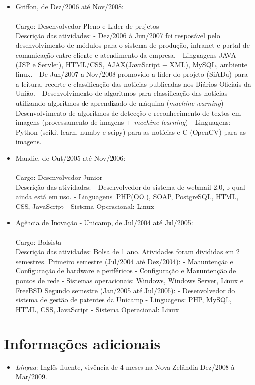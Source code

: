 \documentclass[a4paper,11pt]{article}
\begin{document}
\begin{itemize}
\item {Griffon, de Dez/2006 até Nov/2008}: \\
{\small \\ 
  {Cargo}: Desenvolvedor Pleno e Líder de projetos\\
  {Descrição das atividades}: 
  \subitem - Dez/2006 à Jun/2007 foi resposável pelo desenvolvimento de módulos para o sistema de produção, intranet e portal de comunicação entre cliente e atendimento da empresa. 
  \subsubitem - Linguagens {JAVA (JSP e Servlet), HTML/CSS, AJAX(JavaScript + XML), MySQL}, ambiente linux.
  \subitem - De Jun/2007 a Nov/2008 promovido a líder do projeto (SiADu) para a leitura, recorte e classificação das noticias publicadas nos Diários Oficiais da União.
	\subsubitem - Desenvolvimento de algoritmos para classificação das notícias utilizando algoritmos de aprendizado de máquina (\textit{machine-learning})
	\subsubitem - Desenvolvimento de algoritmos de detecção e reconhecimento de textos em imagens (processamento de imagens + \textit{machine-learning})
	\subsubitem - Linguagens: Python (scikit-learn, numby e scipy) para as notícias e C (OpenCV) para as imagens.\\
}
\item {Mandic, de Out/2005 até Nov/2006}:\\
{\small \\ 
	  {Cargo}: Desenvolvedor Junior\\
	  {Descrição das atividades}: 
	  \subitem - Desenvolvedor do sistema de webmail 2.0, o qual ainda está em uso. 
	  \subitem - Linguagens: PHP(OO.), SOAP, PostgreSQL, HTML, CSS, JavaScript 
	  \subitem - Sistema Operacional: Linux
}

\item {Agência de Inovação - Unicamp, de Jul/2004 até Jul/2005}:\\
{\small \\ 
  {Cargo}: Bolsista\\
  {Descrição das atividades}: Bolsa de 1 ano. Atividades foram divididas em 2 semestres.
  \subitem Primeiro semestre (Jul/2004 até Dez/2004):
	  \subsubitem - Manuntenção e Configuração de hardware e periféricos
	  \subsubitem - Configuração e Manuntenção de pontos de rede
	  \subsubitem - Sistemas operacionais: Windows, Windows Server, Linux e FreeBSD
 \subitem Segundo semestre (Jan/2005 até Jul/2005):
	  \subsubitem - Desenvolvedor do sistema de gestão de patentes da Unicamp
	  \subsubitem - Linguagens: PHP, MySQL, HTML, CSS, JavaScript
	  \subsubitem - Sistema Operacional: Linux\\
}
 
\end{itemize}
\section{Informações adicionais}
\begin{itemize}
\item \emph{Língua}: Inglês fluente, vivência de 4 meses na Nova Zelândia Dez/2008 à Mar/2009.
\end{itemize}
\end{document}
